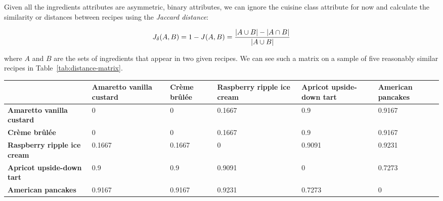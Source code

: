 \documentclass[11pt,a4paper]{article}
\begin{document}
Given all the ingredients attributes are asymmetric, binary attributes, we can ignore
the cuisine class attribute for now and calculate the similarity or distances
between recipes using the \emph{Jaccard distance}: \cite{han2006data}

\begin{equation}
J_{\delta}(A,B) = 1 - J(A,B) = { { |A \cup B| - |A \cap B| } \over |A \cup B| }
\end{equation}

\noindent where $A$ and $B$ are the sets of ingredients that appear in two given
recipes. We can see such a matrix on a sample of five reasonably similar recipes
in Table~\ref{tab:distance-matrix}.


\begin{sidewaystable}
  \centering
  \begin{tabular}{| p{6cm} | p{2.5cm} | p{2.5cm} | p{2.5cm} | p{2.5cm} | p{2.5cm} |}
    \hline
                               & \textbf{Amaretto vanilla custard} & \textbf{Cr\`eme br\^ul\'ee} & \textbf{Raspberry ripple ice cream} & \textbf{Apricot upside-down tart} & \textbf{American pancakes} \\
    \hline
    \textbf{Amaretto vanilla custard}   & 0                        & 0                  & 0.1667                     & 0.9                      & 0.9167            \\
    \hline
    \textbf{Cr\`eme br\^ul\'ee}         & 0                        & 0                  & 0.1667                     & 0.9                      & 0.9167            \\
    \hline
    \textbf{Raspberry ripple ice cream} & 0.1667                   & 0.1667             & 0                          & 0.9091                   & 0.9231            \\
    \hline
    \textbf{Apricot upside-down tart}   & 0.9                      & 0.9                & 0.9091                     & 0                        & 0.7273            \\
    \hline
    \textbf{American pancakes}          & 0.9167                   & 0.9167             & 0.9231                     & 0.7273                   & 0                 \\
    \hline
  \end{tabular}
  \caption{Distance matrix between five dessert recipes}
  \label{tab:distance-matrix}
\end{sidewaystable}
\end{document}
